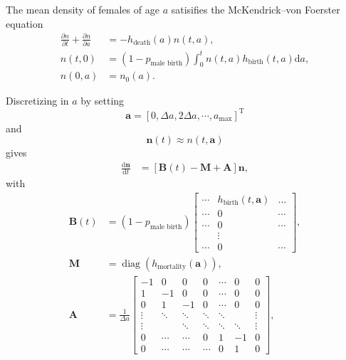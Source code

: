 \documentclass[12pt]{article}
\renewcommand{\vec}[1]{\mathbf{#1}}
\newcommand{\mat}[1]{\mathbf{#1}}
\newcommand{\md}{\mathrm{d}}
\newcommand{\mT}{\mathrm{T}}
\begin{document}
The mean density of females of age $a$ satisifies the McKendrick--von
Foerster equation
\begin{equation}
  \begin{split}
    \frac{\partial n}{\partial t} + \frac{\partial n}{\partial a}
    &= - h_{\text{death}}(a) n(t, a),
    \\
    n(t, 0) &=
    (1 - p_{\text{male birth}})
    \int_0^t n(t, a) h_{\text{birth}}(t, a) \md a,
    \\
    n(0, a) &= n_0(a).
  \end{split}
\end{equation}

Discretizing in $a$ by setting
\begin{equation}
  \label{eq:11}
  \vec{a} = \left[0, \Delta a, 2 \Delta a, \cdots, a_{\text{max}} \right]^{\mT}
\end{equation}
and
\begin{equation}
  \vec{n}(t) \approx n(t, \vec{a})
\end{equation}
gives
\begin{equation}
  \begin{split}
    \frac{\md \vec{n}}{\md t} &=
    \left[\mat{B}(t)
      - \mat{M}
      + \mat{A}\right] \vec{n},
  \end{split}
\end{equation}
with
\begin{equation}
  \begin{split}
    \mat{B}(t)
    &=
    (1 - p_{\text{male birth}})
    \begin{bmatrix}
      \cdots & h_{\text{birth}}(t, \vec{a}) & \dots
      \\
      \cdots & 0 & \cdots
      \\
      \cdots & 0 & \cdots
      \\
      & \vdots &
      \\
      \cdots & 0 & \cdots
    \end{bmatrix},
    \\
    \mat{M} &=
    \operatorname{diag}\left(h_{\text{mortality}}(\vec{a})\right),
    \\
    \mat{A} &=
    \frac{1}{\Delta a}
    \begin{bmatrix}
      -1 & 0 & 0 & 0 & \cdots & 0 & 0
      \\
      1 & -1 & 0 & 0 & \cdots & 0 & 0
      \\
      0 & 1 & -1 & 0 & \cdots & 0 & 0
      \\
      \vdots & \ddots & \ddots & \ddots & \ddots &  & \vdots
      \\
      \vdots &  & \ddots & \ddots & \ddots & \ddots & \vdots
      \\
      0  & \cdots & \cdots & 0 & 1 & - 1 & 0
      \\
      0  & \cdots & \cdots & \cdots & 0 & 1 & 0
    \end{bmatrix},
  \end{split}
\end{equation}
\end{document}
